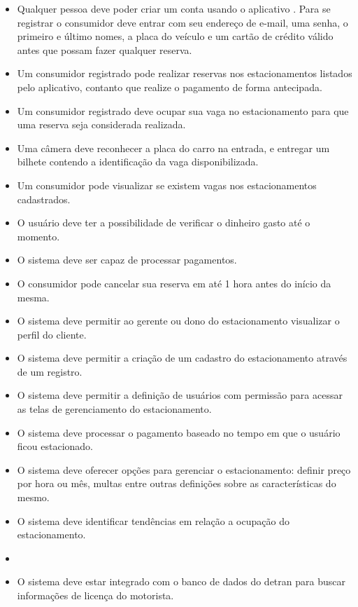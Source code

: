 \begin{itemize}
	\item Qualquer pessoa deve poder criar um conta usando o aplicativo \projectName. Para se registrar o consumidor deve entrar com seu endereço de e-mail, uma senha, o primeiro e último nomes, a placa do veículo e um cartão de crédito válido antes que possam fazer qualquer reserva.
	\item Um consumidor registrado pode realizar reservas nos estacionamentos listados pelo aplicativo, contanto que realize o pagamento de forma antecipada.
	\item Um consumidor registrado deve ocupar sua vaga no estacionamento para que uma reserva seja considerada realizada.
	\item Uma câmera deve reconhecer a placa do carro na entrada, e entregar um bilhete contendo a identificação da vaga disponibilizada.
	\item Um consumidor pode visualizar se existem vagas nos estacionamentos cadastrados.
	\item O usuário deve ter a possibilidade de verificar o dinheiro gasto até o momento.
	\item O sistema deve ser capaz de processar pagamentos.
	\item O consumidor pode cancelar sua reserva em até 1 hora antes do início da mesma.
	\item O sistema deve permitir ao gerente ou dono do estacionamento visualizar o perfil do cliente.
	\item O sistema deve permitir a criação de um cadastro do estacionamento através de um registro.
	\item O sistema deve permitir a definição de usuários com permissão para acessar as telas de gerenciamento do estacionamento.
	\item O sistema deve processar o pagamento baseado no tempo em que o usuário ficou estacionado.
	\item O sistema deve oferecer opções para gerenciar o estacionamento: definir preço por hora ou mês, multas entre outras definições sobre as características do mesmo.
	\item O sistema deve identificar tendências em relação a ocupação do estacionamento.
	\item %
	\item O sistema deve estar integrado com o banco de dados do detran para buscar informações de licença do motorista.

\end{itemize}
